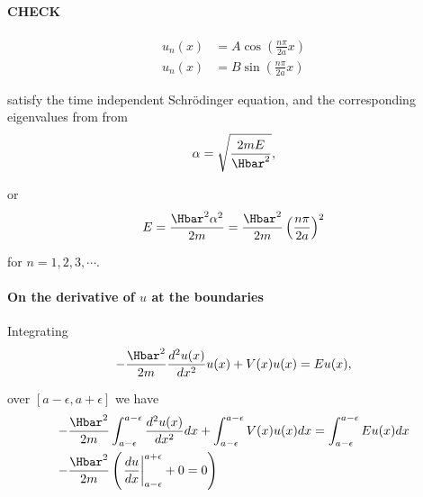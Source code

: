 {\paragraph{CHECK}
%
\begin{equation}\label{eqn:lecture9boundStates:220}
\begin{aligned}
u_n(x) &= A \cos \left( \frac{n \pi}{2 a} x \right) \\
u_n(x) &= B \sin \left( \frac{n \pi}{2 a} x \right)
\end{aligned}
\end{equation}

satisfy the time independent Schr\"{o}dinger equation, and the corresponding eigenvalues from from
%
\begin{equation}\label{eqn:lecture9boundStates:240}
\begin{aligned}
\alpha = \sqrt{\frac{2 m E}{\Hbar^2}},
\end{aligned}
\end{equation}

or
%
\begin{equation}\label{eqn:lecture9boundStates:260}
\begin{aligned}
E = \frac{\Hbar^2 \alpha^2}{2m} = \frac{\Hbar^2}{2m} \left( \frac{n \pi}{2a} \right)^2
\end{aligned}
\end{equation}

for \(n = 1, 2, 3, \cdots\).

\paragraph{On the derivative of \(u\) at the boundaries}

Integrating
%
\begin{equation}\label{eqn:PHY356Lecture9:20}
\begin{aligned}
-\frac{\Hbar^2 }{2m} \frac{d^2 u(x)}{dx^2} u(x) + V(x) u(x) = E u(x),
\end{aligned}
\end{equation}

over \([a-\epsilon,a+\epsilon]\) we have
%
\begin{equation}\label{eqn:PHY356Lecture9:21}
\begin{aligned}
-\frac{\Hbar^2 }{2m} &
\int_{a-\epsilon}^{a-\epsilon}
\frac{d^2 u(x)}{dx^2} dx
+
\int_{a-\epsilon}^{a-\epsilon}
V(x) u(x) dx =
\int_{a-\epsilon}^{a-\epsilon}
E u(x) dx \\
-\frac{\Hbar^2 }{2m} &
\left(
\left.\frac{du}{dx}\right\vert_{a-\epsilon}^{a+\epsilon} + 0 = 0
\right)
\end{aligned}
\end{equation}

}
